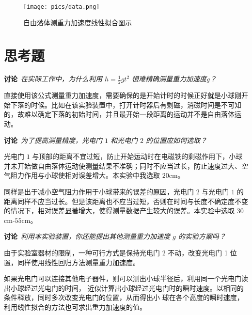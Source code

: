 \documentclass[UTF8]{article}
\newcommand{\sector}[2]{\section*{#1}%
\vspace*{-0.8em}\large{#2}%
\vspace*{-0.3em}
}
\begin{document}
{\begin{figure}[h]
    \centering
    \texttt{[image: pics/data.png]}
    \caption{自由落体测重力加速度线性拟合图示}
\end{figure}


}\sector{思考题}{
    
    \noindent\textbf{讨论}\ \textsl{在实际工作中，为什么利用 $h = \frac{1}{2}gt^2$ 很难精确测量重力加速度g？}
    
    直接使用该公式测量重力加速度，需要确保的是开始计时的时候正好就是小球刚开始下落的时候。比如在该实验装置中，打开计时器后有剩磁，消磁时间是不可知的，故难以确定下落的初始时间，并且最开始一段距离的运动并不是自由落体运动。

    \noindent\textbf{讨论}\ \textsl{为了提高测量精度，光电门 $1$ 和光电门 $2$ 的位置应如何选取？}

    光电门 $1$ 与顶部的距离不宜过短，防止开始运动时在电磁铁的剩磁作用下，小球并未开始做自由落体运动使测量结果不准确；同时不应当过长，防止速度过大、空气阻力作用与小球使相对误差增大。本实验中我选取 $20$cm。

    同样是出于减小空气阻力作用于小球带来的误差的原因，光电门 $2$ 与光电门 $1$ 的距离同样不应当过长。但是该距离也不应当过短，否则在时间与长度不确定度不变的情况下，相对误差显著增大，使得测量数据产生较大的误差。本实验中选取 $30$cm-$55$cm。

    \noindent\textbf{讨论}\ \textsl{利用本实验装置，你还能提出其他测量重力加速度 $g$ 的实验方案吗？}
    
    由于实验室器材的限制，一种可行方式是保持光电门 2 不动，改变光电门 1 位置，同样使用线性回归方法测量重力加速度。

    如果光电门可以连接其他电子器件，则可以测出小球半径后，利用同一个光电门读出小球经过光电门的时间，
近似计算出小球经过光电门时的瞬时速度。以相同的条件释放，同时多次改变光电门的位置，从而得出小
球在各个高度的瞬时速度，利用线性拟合的方法也可求出重力加速度的值。

}
\end{document}
